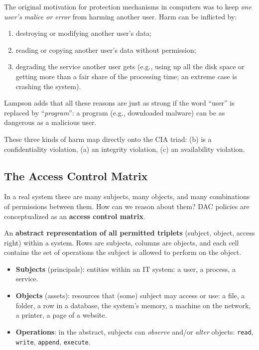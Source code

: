The original motivation for protection mechanisms in computers was to keep \emph{one user's malice or error} from harming another user. Harm can be inflicted by:
\begin{enumerate}
    \item[a)] destroying or modifying another user's data;
    \item[b)] reading or copying another user's data without permission;
    \item[c)] degrading the service another user gets (e.g., using up all the disk space or getting more than a fair share of the processing time; an extreme case is crashing the system).
\end{enumerate}
Lampson adds that all these reasons are just as strong if the word ``user'' is replaced by ``\emph{program}'': a program (e.g., downloaded malware) can be as dangerous as a malicious user.

These three kinds of harm map directly onto the CIA triad: (b) is a confidentiality violation, (a) an integrity violation, (c) an availability violation.

\subsection{The Access Control Matrix}

In a real system there are many subjects, many objects, and many combinations of permissions between them. How can we reason about them? DAC policies are conceptualized as an \textbf{access control matrix}.

\begin{definition}
An \textbf{abstract representation of all permitted triplets} (subject, object, access right) within a system. Rows are subjects, columns are objects, and each cell contains the set of operations the subject is allowed to perform on the object.
\end{definition}

\begin{itemize}
    \item \textbf{Subjects} (principals): entities within an IT system: a user, a process, a service.
    \item \textbf{Objects} (assets): resources that (some) subject may access or use: a file, a folder, a row in a database, the system's memory, a machine on the network, a printer, a page of a website.
    \item \textbf{Operations}: in the abstract, subjects can \emph{observe} and/or \emph{alter} objects: \texttt{read}, \texttt{write}, \texttt{append}, \texttt{execute}.
\end{itemize}

